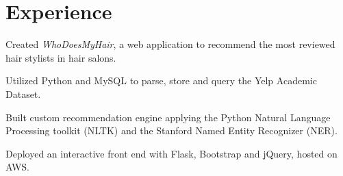 \documentclass[letterpaper]{deedy-resume} %
\begin{document}
\begin{minipage}[t]{0.66\textwidth} %


\section{Experience}


\vspace{\topsep} %
\begin{tightitemize}
\item Created \textit{WhoDoesMyHair}, a web application to recommend the most reviewed hair stylists in hair salons.
\item Utilized Python and MySQL to parse, store and query the Yelp Academic Dataset.
\item Built custom recommendation engine applying the Python Natural Language Processing toolkit (NLTK) and the Stanford Named Entity Recognizer (NER).
\item Deployed an interactive front end with Flask, Bootstrap and jQuery, hosted on AWS.
\end{tightitemize}

\sectionspace %




\end{minipage}
\end{document}
